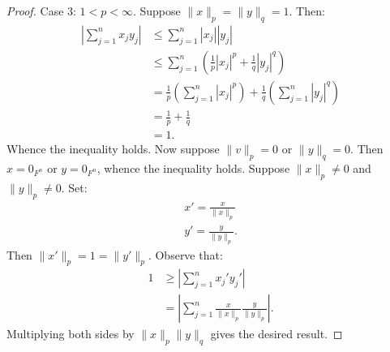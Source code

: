 \begin{proof}
            Case 3: $1 < p < \infty$. Suppose $\lVert x \rVert _p = \lVert y \rVert _q =1 $. Then:
                \begin{equation*}
                \begin{split}
                    \left|\sum_{j = 1}^n x_j y_j\right|
                    & \leq \sum_{j = 1}^n |x_j||y_j| \\
                    & \leq \sum_{j =1}^n \left(\frac{1}{p}|x_j|^p + \frac{1}{q}|y_j|^q\right) \\
                    & = \frac{1}{p} \left(\sum_{j = 1}^n |x_j|^p\right) + \frac{1}{q} \left(\sum_{j = 1}^n|y_j|^q\right) \\
                    & = \frac{1}{p} + \frac{1}{q} \\
                    & = 1.
                \end{split}
                \end{equation*}
            Whence the inequality holds. Now suppose $\lVert v \rVert _p = 0$ or $\lVert y \rVert _q = 0$. Then $x = 0_{F^n}$ or $y = 0_{F^n}$, whence the inequality holds. Suppose $\lVert x \rVert _p \neq 0$ and $\lVert y \rVert _p \neq 0$. Set:
                \begin{equation*}
                \begin{split}
                    x' = \frac{x}{\lVert x \rVert _p} \\
                    y' = \frac{y}{ \lVert y \rVert _p}.
                \end{split}
                \end{equation*}
            Then $\lVert x' \rVert _p = 1 = \lVert y' \rVert _p$. Observe that:
                \begin{equation*}
                \begin{split}
                    1 &\geq \left|\sum_{j = 1}^n x_j' y_j'\right| \\
                    & = \left|\sum_{j = 1}^n \frac{x}{\lVert x \rVert _p}\frac{y}{ \lVert y \rVert _p}\right|.
                \end{split}
                \end{equation*}
            Multiplying both sides by $\lVert x \rVert _p \lVert y \rVert _q$ gives the desired result.
        \end{proof}

